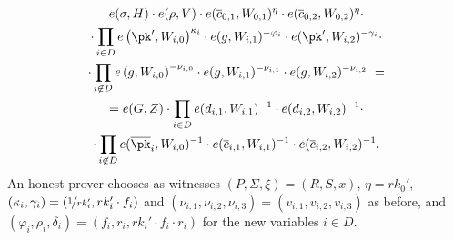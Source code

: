 \documentclass[runningheads]{llncs}
\begin{document}
\begin{multline}
\label{e:zkpsig1linear}
e(\sigma, H)\cdot  e(\rho, V) \cdot e(\overline c_{0,1}, W_{0,1})^{\eta} \cdot e(\overline c_{0,2},W_{0,2})^{\eta}\cdot 
\\
\cdot 
\prod_{i\in D} e\left(\pk',W_{i,0}\right)^{\kappa_{i}} \cdot e(g, W_{i,1})^{-\varphi_{i}} \cdot e(\pk', W_{i,2})^{-\gamma_{i}}\cdot
\\
\cdot \prod_{i\not\in D} e\left(g,W_{i,0}\right)^{-\nu_{i,0}} \cdot e(g, W_{i,1})^{-\nu_{i,1}} \cdot e(g, W_{i,2})^{-\nu_{i,2}}\ =
\\ 
= e(G,Z)\cdot
\prod_{i\in D} e(d_{i,1}, W_{i,1})^{-1} \cdot  e(d_{i,2}, W_{i,2})^{-1}\cdot
\\
\cdot
\prod_{i\not\in D}  e(\overline\pk_i, W_{i,0})^{-1} \cdot   e(\overline c_{i,1}, W_{i,1})^{-1} \cdot  e(\overline c_{i,2}, W_{i,2})^{-1}.
\end{multline}
An honest prover chooses as witnesses $(P,\Sigma, \xi) = (R,S,x)$, $\eta = rk_0'$, 
$\left(\kappa_{i}, \gamma_{i}\right) = \left(\nicefrac{1}{rk_i'}, rk_i'\cdot f_{i} \right)$ and  $\left(\nu_{i,1},\nu_{i,2},\nu_{i,3}\right) = \left(v_{i,1}, v_{i,2}, v_{i,3}\right)$ as before, and 
$\left(\varphi_{i},\rho_{i}, \delta_{i}\right) = \left(f_{i},r_i,  rk_i'\cdot f_{i}\cdot r_i \right)$ for the new variables $i\in D$.
\fi
\end{document}
